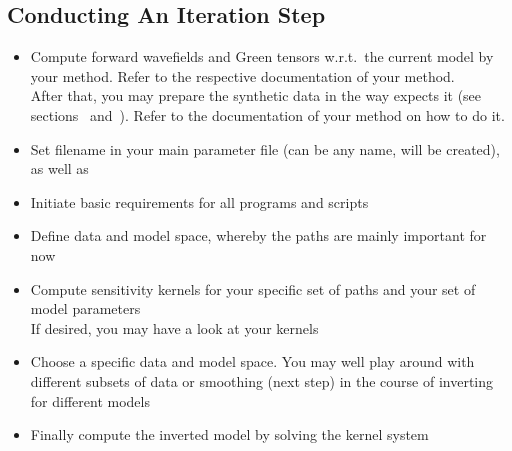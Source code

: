 \subsection*{Conducting An Iteration Step}
%
\begin{itemize}
\item Compute forward wavefields and Green tensors w.r.t.\ the current model 
by your method. Refer to the respective documentation of your method.\\
After that, you may prepare the synthetic data in the way \ASKI expects it (see sections~ 
and~). Refer to the documentation of your method on how to do it.\\
%
\item Set filename  in your main parameter file (can be any name, will be created), 
as well as  
%
\item Initiate basic requirements for all programs and scripts  
%
\item Define data and model space, whereby the paths are mainly important for now 
%
\item Compute sensitivity kernels for your specific set of paths and your set of model parameters 
   \\
  If desired, you may have a look at your kernels 
%
\item Choose a specific data and model space. You may well play around with different subsets of data or
smoothing (next step) in the course of inverting for different models
%
\item Finally compute the inverted model by solving the kernel system 
\end{itemize}




